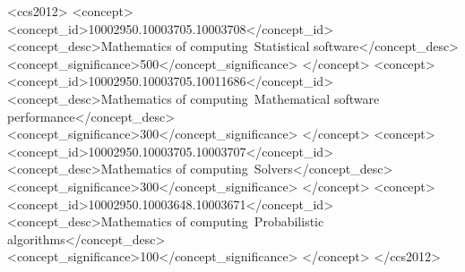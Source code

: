 \documentclass[acmsmall]{acmart}
\begin{document}
\begin{abstract}
\end{abstract}

\begin{CCSXML}
<ccs2012>
   <concept>
       <concept_id>10002950.10003705.10003708</concept_id>
       <concept_desc>Mathematics of computing~Statistical software</concept_desc>
       <concept_significance>500</concept_significance>
       </concept>
   <concept>
       <concept_id>10002950.10003705.10011686</concept_id>
       <concept_desc>Mathematics of computing~Mathematical software performance</concept_desc>
       <concept_significance>300</concept_significance>
       </concept>
   <concept>
       <concept_id>10002950.10003705.10003707</concept_id>
       <concept_desc>Mathematics of computing~Solvers</concept_desc>
       <concept_significance>300</concept_significance>
       </concept>
   <concept>
       <concept_id>10002950.10003648.10003671</concept_id>
       <concept_desc>Mathematics of computing~Probabilistic algorithms</concept_desc>
       <concept_significance>100</concept_significance>
       </concept>
 </ccs2012>
\end{CCSXML}


\end{document}
